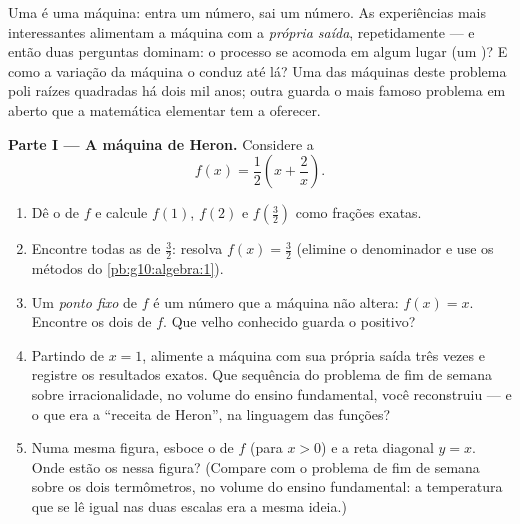 \begin{problem}
\label{pb:g10:functions:1}
Uma  é uma máquina: entra um número, sai um número. As
experiências mais interessantes alimentam a máquina com a
\emph{própria saída}, repetidamente --- e então duas perguntas
dominam: o processo se acomoda em algum lugar (um \emph{})? E como a variação da máquina o conduz até lá? Uma das
máquinas deste problema poli raízes quadradas há dois mil anos;
outra guarda o mais famoso problema em aberto que a matemática
elementar tem a oferecer.

\medskip
\noindent\textbf{Parte I --- A máquina de Heron.}
Considere a 
\[
f(x) = \frac12\left(x + \frac2x\right).
\]
\begin{enumerate}
  \item Dê o  de $f$ e calcule $f(1)$, $f(2)$ e
        $f\!\left(\frac32\right)$ como frações exatas.
  \item Encontre todas as  de $\frac32$: resolva
        $f(x) = \frac32$ (elimine o denominador e use os métodos
        do \cref{pb:g10:algebra:1}).
  \item Um \emph{ponto fixo} de $f$ é um
        número que a máquina não altera: $f(x) = x$. Encontre os
        dois  de $f$. Que velho conhecido guarda o
        positivo?
  \item Partindo de $x = 1$, alimente a máquina com sua própria
        saída três vezes e registre os resultados exatos. Que
        sequência do problema de fim de semana sobre
        irracionalidade, no volume do ensino fundamental, você
        reconstruiu --- e o que era a ``receita de Heron'', na
        linguagem das funções?
  \item Numa mesma figura, esboce o  de $f$ (para $x > 0$)
        e a reta diagonal $y = x$. Onde estão os 
        nessa figura? (Compare com o problema de fim de semana
        sobre os dois termômetros, no volume do ensino
        fundamental: a temperatura que se lê igual nas duas
        escalas era a mesma ideia.)
\end{enumerate}


\end{problem}
